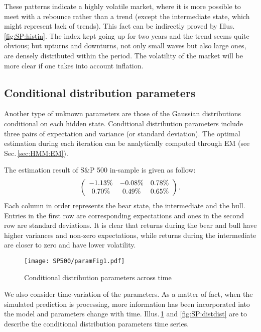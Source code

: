 These patterns indicate a highly volatile market, 
where it is more possible to meet with a rebounce rather than a trend 
(except the intermediate state, which might represent lack of trends).
This fact can be indirectly proved by Illus.\,\ref{fig:SP:histin}.
The index kept going up for two years and the trend seems quite obvious;
but upturns and downturns, not only small waves but also large ones, 
are densely distributed within the period.
The volatility of the market will be more clear if one takes into account inflation.


\subsection{Conditional distribution parameters}
\label{sec:positive:SP:distribution}
Another type of unknown parameters are those of the Gaussian distributions 
conditional on each hidden state.
Conditional distribution parameters include three pairs of 
expectation and variance (or standard deviation).
The optimal estimation during each iteration can be analytically computed through EM
(see Sec.\,\ref{sec:HMM:EM}).

The estimation result of S\&P 500 in-sample is given as follow:
        \begin{equation}
        \left (
        \begin{array}{c c c}
        -1.13\%  &  -0.08\%  &  0.78\%  \\
         0.70\%  &   0.49\%  &  0.65\%  \\
        \end{array}
        \right ).
        \end{equation}
Each column in order represents the bear state, the intermediate and the bull.
Entries in the first row are corresponding expectations 
and ones in the second row are standard deviations.
It is clear that returns during the bear and bull 
have higher variances and non-zero expectations,
while returns during the intermediate are closer to zero and have lower volatility.

        \begin{figure}[!hbt]
        \center
        \texttt{[image: SP500/paramFig1.pdf]}
        \caption{Conditional distribution parameters across time}
        \label{fig:SP:distscatter}
        \end{figure}
We also consider time-variation of the parameters.
As a matter of fact, when the simulated prediction is processing,
more information has been incorporated into the model and parameters change with time.
Illus.\,\ref{fig:SP:distscatter} and \ref{fig:SP:distdist} are to 
describe the conditional distribution parameters time series.

